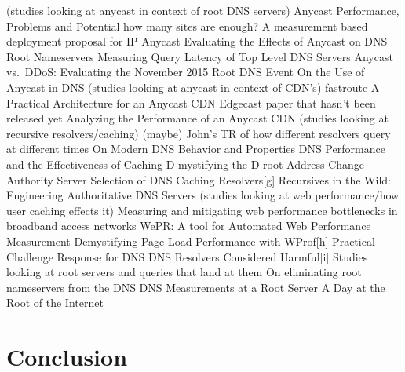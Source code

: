 \documentclass[sigconf,nonacm,10pt]{acmart}
\begin{document}
(studies looking at anycast in context of root DNS servers) Anycast
Performance, Problems and Potential how many sites are enough? A
measurement based deployment proposal for IP Anycast Evaluating the
Effects of Anycast on DNS Root Nameservers Measuring Query Latency of
Top Level DNS Servers Anycast vs.~DDoS: Evaluating the November 2015
Root DNS Event On the Use of Anycast in DNS (studies looking at anycast
in context of CDN's) fastroute A Practical Architecture for an Anycast
CDN Edgecast paper that hasn't been released yet Analyzing the
Performance of an Anycast CDN (studies looking at recursive
resolvers/caching) (maybe) John's TR of how different resolvers query at
different times On Modern DNS Behavior and Properties DNS Performance
and the Effectiveness of Caching D-mystifying the D-root Address Change
Authority Server Selection of DNS Caching Resolvers{[}g{]} Recursives in
the Wild: Engineering Authoritative DNS Servers (studies looking at web
performance/how user caching effects it) Measuring and mitigating web
performance bottlenecks in broadband access networks WePR: A tool for
Automated Web Performance Measurement Demystifying Page Load Performance
with WProf{[}h{]} Practical Challenge Response for DNS DNS Resolvers
Considered Harmful{[}i{]} Studies looking at root servers and queries
that land at them On eliminating root nameservers from the DNS DNS
Measurements at a Root Server A Day at the Root of the Internet

\fi

\section{Conclusion}\label{conclusion-1}
\end{document}
